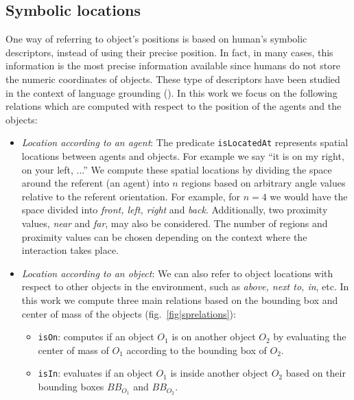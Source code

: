 \documentclass{svmult}
\newcommand{\concept}[1]{{\footnotesize \texttt{#1}}}
\begin{document}
\subsection{Symbolic locations}

One way of referring to object's positions is based on human's symbolic 
descriptors, instead of using their precise position. In fact, in many cases, 
this information is the most precise information available since humans do not 
store the numeric coordinates of objects. These type of descriptors have been 
studied in the context of language grounding 
(\cite{O'Keefe1999,Matuszek2010,Regier2001,Kelleher2009,Blisard2005}). In this 
work we focus on the following relations which are computed with respect to the 
position of the agents and the objects:

\begin{itemize} 

\item \emph{Location according to an agent}: The predicate
\concept{isLocatedAt} represents spatial locations between agents and objects.
For example we say ``it is on my right, on your left, ...'' We compute these
spatial locations by dividing the space around the referent (an agent) into $n$
regions based on arbitrary angle values relative to the referent orientation.
For example, for $n = 4$ we would have the space divided into \emph{front,
left, right} and \emph{back}. Additionally, two proximity values, \emph{near}
and \emph{far}, may also be considered. The number of regions and proximity
values can be chosen depending on the context where the interaction takes
place.

\item \emph{Location according to an object}: We can also refer to object
locations with respect to other objects in the environment, such as \emph{above,
next to, in}, etc. In this work we compute three main relations based on the
bounding box and center of mass of the objects 
(fig.~\ref{fig|sprelations}): 

\begin{itemize}
	\item \concept{isOn}: computes if an object $O_1$ is on another object $O_2$ by
	evaluating the center of mass of $O_1$ according to the bounding box of $O_2$.

	\item \concept{isIn}: evaluates if an object $O_1$ is inside another object
	$O_2$ based on their bounding boxes $BB_{O_1}$ and $BB_{O_2}$.


\end{itemize}
\end{itemize}
\end{document}

